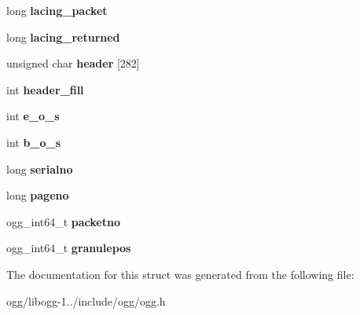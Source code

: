 \begin{DoxyCompactItemize}
\item 
\hypertarget{structogg__stream__state_add3aba822d7f0e2e23c1927a20aaa683}{long {\bfseries lacing\+\_\+packet}}\label{structogg__stream__state_add3aba822d7f0e2e23c1927a20aaa683}

\item 
\hypertarget{structogg__stream__state_a541d66311781b45cf37d87107d515602}{long {\bfseries lacing\+\_\+returned}}\label{structogg__stream__state_a541d66311781b45cf37d87107d515602}

\item 
\hypertarget{structogg__stream__state_a5c83d7bc34e1d6bd15e424a7feb59b5d}{unsigned char {\bfseries header} \mbox{[}282\mbox{]}}\label{structogg__stream__state_a5c83d7bc34e1d6bd15e424a7feb59b5d}

\item 
\hypertarget{structogg__stream__state_af37e7ffba5e7197c8bfabee7a1a6b641}{int {\bfseries header\+\_\+fill}}\label{structogg__stream__state_af37e7ffba5e7197c8bfabee7a1a6b641}

\item 
\hypertarget{structogg__stream__state_a366e94e72849e0e880d53a22bb9ee646}{int {\bfseries e\+\_\+o\+\_\+s}}\label{structogg__stream__state_a366e94e72849e0e880d53a22bb9ee646}

\item 
\hypertarget{structogg__stream__state_a76fcc3bf6a59eff87ec3bee1d16fa0b5}{int {\bfseries b\+\_\+o\+\_\+s}}\label{structogg__stream__state_a76fcc3bf6a59eff87ec3bee1d16fa0b5}

\item 
\hypertarget{structogg__stream__state_a79248e3f1f41cde5331909e8edd98e10}{long {\bfseries serialno}}\label{structogg__stream__state_a79248e3f1f41cde5331909e8edd98e10}

\item 
\hypertarget{structogg__stream__state_a0ad3315203fcebdc2ccd3b050d28a65c}{long {\bfseries pageno}}\label{structogg__stream__state_a0ad3315203fcebdc2ccd3b050d28a65c}

\item 
\hypertarget{structogg__stream__state_a1bebf380025b6ca0841497e7ab2b5c34}{ogg\+\_\+int64\+\_\+t {\bfseries packetno}}\label{structogg__stream__state_a1bebf380025b6ca0841497e7ab2b5c34}

\item 
\hypertarget{structogg__stream__state_a5df750c600660686e29f24b4d1ce836c}{ogg\+\_\+int64\+\_\+t {\bfseries granulepos}}\label{structogg__stream__state_a5df750c600660686e29f24b4d1ce836c}

\end{DoxyCompactItemize}


The documentation for this struct was generated from the following file\+:\begin{DoxyCompactItemize}
\item 
ogg/libogg-\/1../include/ogg/ogg.\+h\end{DoxyCompactItemize}

